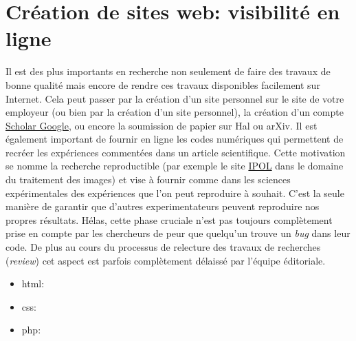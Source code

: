 \section{Création de sites web: visibilité en ligne}
Il est des plus importants en recherche non seulement de faire des travaux de bonne qualité
mais encore de rendre ces travaux disponibles facilement sur Internet. Cela peut passer par la création
d'un site personnel sur le site de votre employeur (ou bien par la création d'un site personnel),
la création d'un compte \href{http://scholar.google.com}{Scholar Google}, ou encore la soumission de papier
sur Hal ou arXiv.
Il est également important de fournir en ligne les codes numériques qui permettent de recréer les 
expériences commentées dans un article scientifique. Cette motivation se nomme 
la recherche reproductible (\lcf par exemple le site \href{http://www.ipol.im/}{IPOL} dans le domaine
du traitement des images)  et vise à fournir comme dans les sciences expérimentales des expériences 
que l'on peut reproduire à souhait. C'est la seule manière de garantir que d'autres experimentateurs
peuvent reproduire nos propres résultats. Hélas, cette phase cruciale n'est pas toujours complètement 
prise en compte par les chercheurs de peur que quelqu'un trouve un \textit{bug} dans leur code.
De plus au cours du processus de relecture des travaux de recherches (\textit{review}) cet
aspect est parfois complètement délaissé par l'équipe éditoriale.

\begin{itemize}
 \item  html:
 \item  css:
 \item  php:
\end{itemize}


